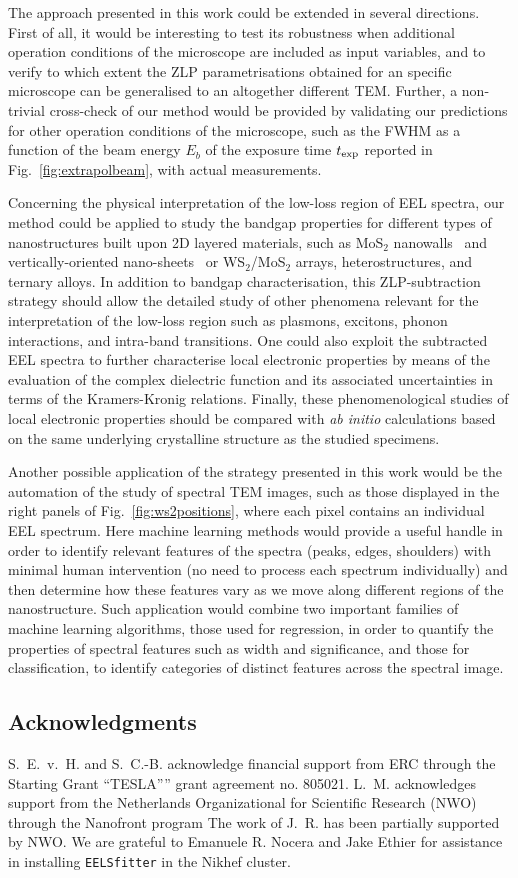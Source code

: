 The approach presented in this work could be extended
in several directions.
%
First of all, it would be interesting to test its robustness when additional
operation conditions of the microscope are included as input variables,
and to verify to which extent the ZLP parametrisations obtained for an specific microscope
can be generalised to an altogether different TEM.
%
Further, a non-trivial cross-check of our method would be provided by validating
our predictions for other operation conditions of the microscope, such
as the FWHM as a function of the beam energy $E_b$ of the exposure time
$t_{\rm exp}$ reported in Fig.~\ref{fig:extrapolbeam},
with actual measurements.

Concerning the physical interpretation of the low-loss region of EEL
spectra, our method could be applied to study the bandgap properties 
for different types
of nanostructures built upon 2D layered materials, such as MoS$_2$ nanowalls~\cite{nanowalls}
and 
vertically-oriented nano-sheets~\cite{D0NR00755B} or
WS$_2$/MoS$_2$ arrays, heterostructures, and ternary alloys.
%
In addition to bandgap characterisation, this ZLP-subtraction
strategy should allow the detailed study
of other phenomena relevant for the interpretation of the low-loss
region such as  plasmons, excitons, phonon interactions, and
intra-band transitions.
%
One could also exploit the subtracted EEL spectra to further characterise
local electronic properties by means of the
 evaluation of the complex dielectric function and its associated
uncertainties in terms of the Kramers-Kronig relations.
%
Finally, these phenomenological studies of local electronic properties should be compared
with {\it ab initio} calculations based
on the same underlying crystalline structure as the studied specimens.

Another possible application of the strategy presented in this work would be the automation of
the study of spectral TEM images,
such as those displayed in the right panels of Fig.~\ref{fig:ws2positions},
where each pixel contains an individual EEL spectrum.
%
Here machine learning methods would provide a  useful handle in order
to identify relevant features of the spectra (peaks, edges, shoulders) with minimal
human intervention (no need to process each spectrum individually) and then determine
how these features vary as we move along different regions of the
nanostructure.
%
Such application would combine two important families of machine learning algorithms,
those used for regression, in order to quantify the properties of spectral
features such as width and significance, and those for classification, to identify categories
of distinct features across the spectral image.

\subsection*{Acknowledgments}
%
S.~E.~v.~H. and S.~C.-B. acknowledge financial support
from ERC through the Starting Grant ``TESLA”'' grant agreement
no. 805021.
%
L.~M. acknowledges support from the
Netherlands Organizational for Scientific Research (NWO)
through the Nanofront program
%
The work of J.~R. has been partially supported by NWO.
%
We are grateful to Emanuele R. Nocera and Jake Ethier for
assistance in installing {\tt EELSfitter} in the Nikhef cluster.
